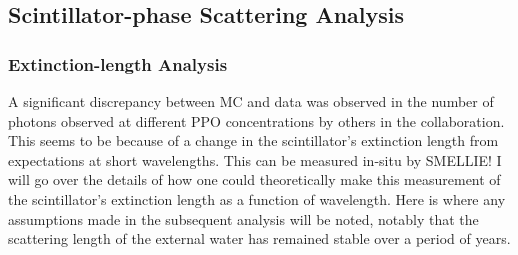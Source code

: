 \subsection{Scintillator-phase Scattering Analysis}
\subsubsection{Extinction-length Analysis}
A significant discrepancy between MC and data was observed in the number of photons observed at different PPO concentrations by others in the collaboration. This seems to be because of a change in the scintillator's extinction length from expectations at short wavelengths. This can be measured in-situ by SMELLIE! I will go over the details of how one could theoretically make this measurement of the scintillator's extinction length as a function of wavelength. Here is where any assumptions made in the subsequent analysis will be noted, notably that the scattering length of the external water has remained stable over a period of years.

